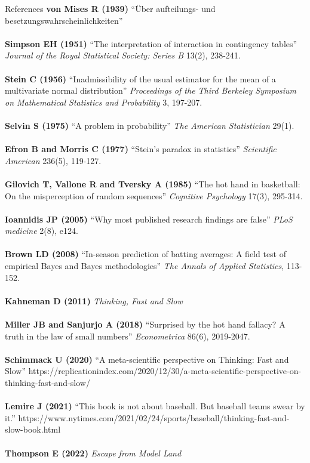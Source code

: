 \documentclass[handout]{beamer}
\begin{document}
  \begin{frame}{References}
    \tiny
    {\bf von Mises R (1939)} ``\"{U}ber aufteilungs- und besetzungswahrscheinlichkeiten''\\
    ~\\
    {\bf Simpson EH (1951)} ``The interpretation of interaction in contingency tables'' {\it Journal of the Royal Statistical Society: Series B} 13(2), 238-241.\\
    ~\\
    {\bf Stein C (1956)} ``Inadmissibility of the usual estimator for the mean of a multivariate normal distribution'' {\it Proceedings of the Third Berkeley Symposium on Mathematical Statistics and Probability} 3, 197-207.\\
    ~\\
    {\bf Selvin S (1975)} ``A problem in probability'' {\it The American Statistician} 29(1).\\
    ~\\
    {\bf Efron B and Morris C (1977)} ``Stein's paradox in statistics'' {\it Scientific American} 236(5), 119-127.\\
    ~\\
    {\bf Gilovich T, Vallone R and Tversky A (1985)} ``The hot hand in basketball: On the misperception of random sequences'' {\it Cognitive Psychology} 17(3), 295-314.\\
    ~\\
    {\bf Ioannidis JP (2005)} ``Why most published research findings are false'' {\it PLoS medicine} 2(8), e124.\\
    ~\\
    {\bf Brown LD (2008)} ``In-season prediction of batting averages: A field test of empirical Bayes and Bayes methodologies'' {\it The Annals of Applied Statistics}, 113-152.\\
    ~\\
    {\bf Kahneman D (2011)} {\it Thinking, Fast and Slow}\\
    ~\\
    {\bf Miller JB and Sanjurjo A (2018)} ``Surprised by the hot hand fallacy? A truth in the law of small numbers'' {\it Econometrica} 86(6), 2019-2047.\\
    ~\\
    {\bf Schimmack U (2020)} ``A meta-scientific perspective on Thinking: Fast and Slow'' https://replicationindex.com/2020/12/30/a-meta-scientific-perspective-on-thinking-fast-and-slow/\\
    ~\\
    {\bf Lemire J (2021)} ``This book is not about baseball. But baseball teams swear by it.'' https://www.nytimes.com/2021/02/24/sports/baseball/thinking-fast-and-slow-book.html\\
    ~\\
    {\bf Thompson E (2022)} {\it Escape from Model Land}\\
  \end{frame}
\end{document}
